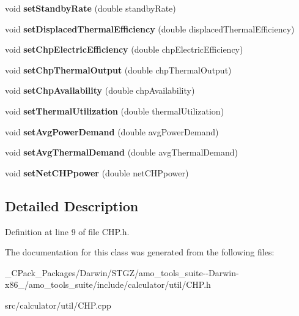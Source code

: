 \begin{DoxyCompactItemize}
\item 
\mbox{\label{class_c_h_p_ac25d489d5d3e336f7286c0124f81d3c5}} 
void {\bfseries set\+Standby\+Rate} (double standby\+Rate)
\item 
\mbox{\label{class_c_h_p_a6f80ede27800dfdeb0493e0501823fde}} 
void {\bfseries set\+Displaced\+Thermal\+Efficiency} (double displaced\+Thermal\+Efficiency)
\item 
\mbox{\label{class_c_h_p_a63de982e8324e669ea8a6712a30a6ce4}} 
void {\bfseries set\+Chp\+Electric\+Efficiency} (double chp\+Electric\+Efficiency)
\item 
\mbox{\label{class_c_h_p_a4b132e4e600df80fa87c0e7b680733b7}} 
void {\bfseries set\+Chp\+Thermal\+Output} (double chp\+Thermal\+Output)
\item 
\mbox{\label{class_c_h_p_a0dc3c1f0e0b67564a56b5863c1abf974}} 
void {\bfseries set\+Chp\+Availability} (double chp\+Availability)
\item 
\mbox{\label{class_c_h_p_a8917dfa8b8a68244d0ffe3fd3ca1d13f}} 
void {\bfseries set\+Thermal\+Utilization} (double thermal\+Utilization)
\item 
\mbox{\label{class_c_h_p_a4f3183df776744f6871fb59b07553d2c}} 
void {\bfseries set\+Avg\+Power\+Demand} (double avg\+Power\+Demand)
\item 
\mbox{\label{class_c_h_p_a0036fd3fc3154adc0fdba0ede8277bee}} 
void {\bfseries set\+Avg\+Thermal\+Demand} (double avg\+Thermal\+Demand)
\item 
\mbox{\label{class_c_h_p_a625efb308ccd22c8bdf75f082ff7bae2}} 
void {\bfseries set\+Net\+C\+H\+Ppower} (double net\+C\+H\+Ppower)
\end{DoxyCompactItemize}


\subsection{Detailed Description}


Definition at line 9 of file C\+H\+P.\+h.



The documentation for this class was generated from the following files\+:\begin{DoxyCompactItemize}
\item 
\+\_\+\+C\+Pack\+\_\+\+Packages/\+Darwin/\+S\+T\+G\+Z/amo\+\_\+tools\+\_\+suite-\/-\/\+Darwin-\/x86\+\_/amo\+\_\+tools\+\_\+suite/include/calculator/util/C\+H\+P.\+h\item 
src/calculator/util/C\+H\+P.\+cpp\end{DoxyCompactItemize}
